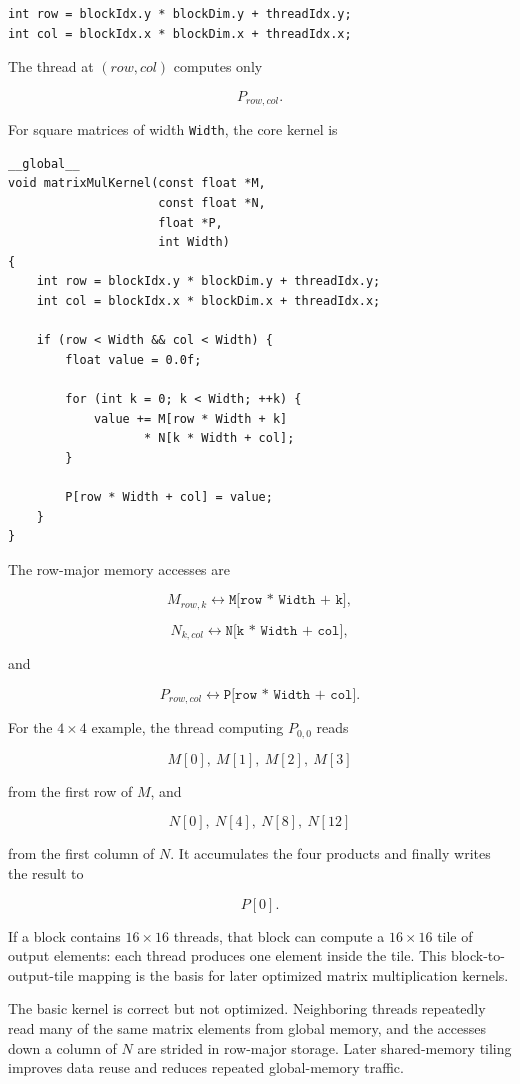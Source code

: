 \documentclass[11pt,a4paper]{article}
\begin{document}
\begin{lstlisting}
int row = blockIdx.y * blockDim.y + threadIdx.y;
int col = blockIdx.x * blockDim.x + threadIdx.x;
\end{lstlisting}

The thread at \((row,col)\) computes only

\[
P_{row,col}.
\]

For square matrices of width \texttt{Width}, the core kernel is

\begin{lstlisting}
__global__
void matrixMulKernel(const float *M,
                     const float *N,
                     float *P,
                     int Width)
{
    int row = blockIdx.y * blockDim.y + threadIdx.y;
    int col = blockIdx.x * blockDim.x + threadIdx.x;

    if (row < Width && col < Width) {
        float value = 0.0f;

        for (int k = 0; k < Width; ++k) {
            value += M[row * Width + k]
                   * N[k * Width + col];
        }

        P[row * Width + col] = value;
    }
}
\end{lstlisting}

The row-major memory accesses are

\[
M_{row,k}
\longleftrightarrow
\texttt{M[row * Width + k]},
\]

\[
N_{k,col}
\longleftrightarrow
\texttt{N[k * Width + col]},
\]

and

\[
P_{row,col}
\longleftrightarrow
\texttt{P[row * Width + col]}.
\]

For the \(4\times4\) example, the thread computing \(P_{0,0}\) reads

\[
M[0],\ M[1],\ M[2],\ M[3]
\]

from the first row of \(M\), and

\[
N[0],\ N[4],\ N[8],\ N[12]
\]

from the first column of \(N\). It accumulates the four products and finally writes the result to

\[
P[0].
\]

If a block contains \(16\times16\) threads, that block can compute a \(16\times16\) tile of output elements: each thread produces one element inside the tile. This block-to-output-tile mapping is the basis for later optimized matrix multiplication kernels.

The basic kernel is correct but not optimized. Neighboring threads repeatedly read many of the same matrix elements from global memory, and the accesses down a column of \(N\) are strided in row-major storage. Later shared-memory tiling improves data reuse and reduces repeated global-memory traffic.
\end{document}
